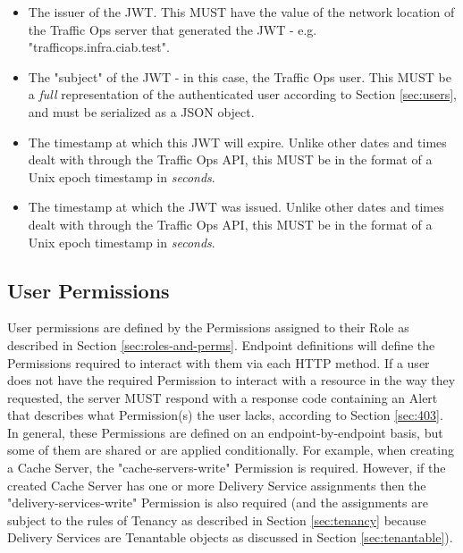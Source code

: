 \begin{itemize}
	\item {} The issuer of the JWT. This MUST have the value of the network location of the Traffic Ops server that
	generated the JWT - e.g. "trafficops.infra.ciab.test".
	\item {} The "subject" of the JWT - in this case, the Traffic Ops user. This MUST be a \emph{full} representation of the
	authenticated user according to Section \ref{sec:users}, and must be serialized as a JSON object.
	\item {} The timestamp at which this JWT will expire. Unlike other dates and times dealt with through the Traffic Ops API, this
	MUST be in the format of a Unix epoch timestamp in \emph{seconds}.
	\item {} The timestamp at which the JWT was issued. Unlike other dates and times dealt with through the Traffic Ops API, this
	MUST be in the format of a Unix epoch timestamp in \emph{seconds}.
\end{itemize}

\subsection{User Permissions}
User permissions are defined by the Permissions assigned to their Role as described in Section \ref{sec:roles-and-perms}. Endpoint definitions
will define the Permissions required to interact with them via each HTTP method. If a user does not have the required Permission to interact
with a resource in the way they requested, the server MUST respond with a  response code containing an Alert that describes
what Permission(s) the user lacks, according to Section \ref{sec:403}. In general, these Permissions are defined on an endpoint-by-endpoint basis,
but some of them are shared or are applied conditionally. For example, when creating a Cache Server, the "cache-servers-write" Permission is
required. However, if the created Cache Server has one or more Delivery Service assignments then the "delivery-services-write" Permission is also
required (and the assignments are subject to the rules of Tenancy as described in Section \ref{sec:tenancy} because Delivery Services are
Tenantable objects as discussed in Section \ref{sec:tenantable}).

